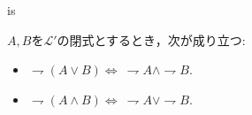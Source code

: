 	is
	
	\begin{screen}
		\begin{logicalthm}[De Morganの法則]
			$A,B$を$\mathcal{L}'$の閉式とするとき，次が成り立つ:
			\begin{itemize}
				\item $\rightharpoondown (A \vee B) \Longleftrightarrow\ \rightharpoondown A \wedge \rightharpoondown B$.
			
				\item $\rightharpoondown (A \wedge B) \Longleftrightarrow\ \rightharpoondown A \vee \rightharpoondown B$.
			\end{itemize}
		\end{logicalthm}
	\end{screen}
	
